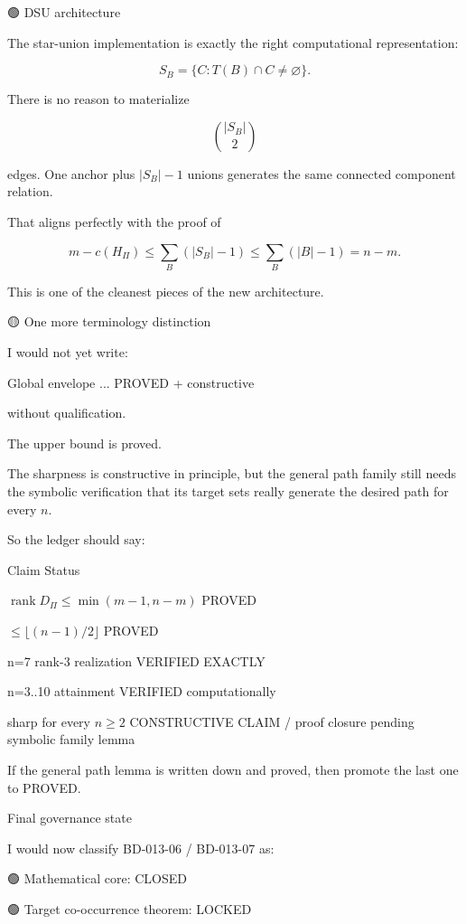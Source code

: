 🟢 DSU architecture


The star-union implementation is exactly the right computational representation:

\[
S_B=\{C:T(B)\cap C\ne\varnothing\}.  
\]

There is no reason to materialize

\[
\binom{|S_B|}{2}  
\]

edges. One anchor plus \(|S_B|-1\) unions generates the same connected component relation.


That aligns perfectly with the proof of

\[
m-c(H_\Pi)  
\le  
\sum_B(|S_B|-1)  
\le  
\sum_B(|B|-1)  
=n-m.  
\]

This is one of the cleanest pieces of the new architecture.



🟡 One more terminology distinction


I would not yet write:




Global envelope ... PROVED + constructive




without qualification.


The upper bound is proved.


The sharpness is constructive in principle, but the general path family still needs the symbolic verification that its target sets really generate the desired path for every \(n\).


So the ledger should say:


Claim	Status


\(\operatorname{rank}D_\Pi\le\min(m-1,n-m)\)	PROVED

\(\le\lfloor(n-1)/2\rfloor\)	PROVED

n=7 rank-3 realization	VERIFIED EXACTLY

n=3..10 attainment	VERIFIED computationally

sharp for every \(n\ge2\)	CONSTRUCTIVE CLAIM / proof closure pending symbolic family lemma


If the general path lemma is written down and proved, then promote the last one to PROVED.



Final governance state


I would now classify BD-013-06 / BD-013-07 as:


🟢 Mathematical core: CLOSED


🟢 Target co-occurrence theorem: LOCKED


